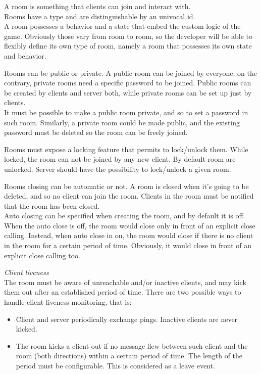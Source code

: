 A room is something that clients can join and interact with.
\\
Rooms have a type and are distinguishable by an univocal id.
\\
A room possesses a behavior and a state that embed the custom logic of the game. Obviously those vary from room to room, so the developer will be able to flexibly define its own type of room, namely a room that possesses its own state and behavior.

\bigskip
Rooms can be public or private. A public room can be joined by everyone; on the contrary, private rooms need a specific password to be joined.
Public rooms can be created by clients and server both, while private rooms can be set up just by clients.  
\\
It must be possible to make a public room private, and so to set a password in such room. Similarly, a private room could be made public, and the existing password must be deleted so the room can be freely joined.  

\bigskip
Rooms must expose a locking feature that permits to lock/unlock them. While locked, the room can not be joined by any new client. By default room are unlocked.
Server should have the possibility to lock/unlock a given room.

\bigskip
Rooms closing can be automatic or not. A room is closed when it's going to be deleted, and so no client can join the room. Clients in the room must be notified that the room has been closed. 
\\
Auto closing can be specified when creating the room, and by default it is off.
\\
When the auto close is off, the room would close only in front of an explicit close calling.
Instead, when auto close in on, the room would close if there is no client in the room for a certain period of time. Obviously, it would close in front of an explicit close calling too.

\bigskip
\textit{Client liveness} 
\\
The room must be aware of unreachable and/or inactive clients, and may kick them out after an established period of time. There are two possible ways to handle client liveness monitoring, that is:
\begin{itemize}
\item Client and server periodically exchange pings. Inactive clients are never kicked.  
\item The room kicks a client out if no message flew between such client and the room (both directions) within a certain period of time. The length of the period must be configurable. This is considered as a leave event.
\end{itemize}

